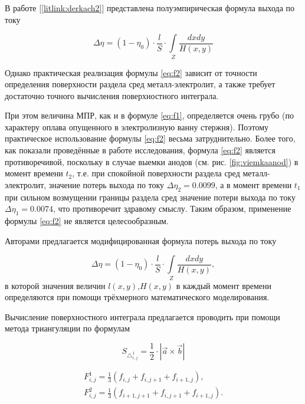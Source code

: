 \documentclass[]{pmi}
\begin{document}
В работе [\ref{litlink:derkach2}] представлена полуэмпирическая формула выхода по току

\begin{equation} \label{eq:f2}
\Delta \eta = (1- \eta_0) \cdot \frac{l}{S} \cdot \int\limits_Z \frac{dxdy}{H(x,y)}
\end{equation}

Однако практическая реализация формулы \ref{eq:f2} зависит от точности определения поверхности раздела сред металл-электролит, а также требует достаточно точного вычисления поверхностного интеграла. 

При этом величина МПР, как и в формуле \ref{eq:f1}, определяется очень грубо (по характеру оплава опущенного в электролизную ванну стержня). Поэтому практическое использование формулы \ref{eq:f2} весьма затруднительно. Более того, как показали проведённые в работе исследования, формула \ref{eq:f2} является противоречивой, поскольку в случае выемки анодов (см. рис. \ref{fig:viemkaanod}) в момент времени $t_2$, т.е. при спокойной поверхности раздела сред металл-электролит, значение  потерь выхода по току $\Delta\eta_2 = 0.0099$, а в момент времени $t_1$ при сильном возмущении границы раздела сред значение потери выхода по току $\Delta\eta_1 = 0.0074$, что противоречит здравому смыслу.  Таким образом, применение формулы \ref{eq:f2} не является целесообразным.

Авторами предлагается модифицированная формула потерь выхода по току 

\begin{equation} \label{eq:modf2}
\Delta \eta = (1- \eta_0) \cdot \frac{l}{S} \cdot \int\limits_Z \frac{dxdy}{H(x,y)},
\end{equation}
в которой значения величин $l(x,y)$,$ H(x,y)$ в каждый момент времени определяются при помощи трёхмерного математического моделирования.

Вычисление поверхностного интеграла предлагается проводить при помощи метода триангуляции по формулам 

\begin{equation}
{S_{\triangle_{i,j}^1}} = \frac{1}{2} \cdot |\overrightarrow{a} \times \overrightarrow{b}|
\end{equation} \label{eq:triangsquare}

\begin{align}
F^1_{i,j} = \frac{1}{3}(f_{i,j}+f_{i,j+1}+f_{i+1,j}), \label{eq:triangf1}\\
F^2_{i,j} = \frac{1}{3}(f_{i+1,j+1}+f_{i,j+1}+f_{i+1,j}). \label{eq:triangf2}
\end{align}
\end{document}
